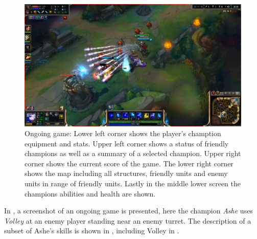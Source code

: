 \begin{figure}[!htb]
  \centering
    \includegraphics[width=1\textwidth]{img/lolgame.png}
  \caption{Ongoing game: Lower left corner shows the player's chamption equipment and stats. Upper left corner shows a status of friendly champions as well as a summary of a selected champion. Upper right corner shows the current score of the game. The lower right corner shows the map including all structures, friendly units and enemy units in range of friendly units. Lastly in the middle lower screen the champions abilities and health are shown.}\label{fig:lolgame}
\end{figure}

In , a screenshot of an ongoing game is presented, here the champion \emph{Ashe} uses \emph{Volley} at an enemy player standing near an enemy turret. The description of a subset of Ashe's skills is shown in , including Volley in .

